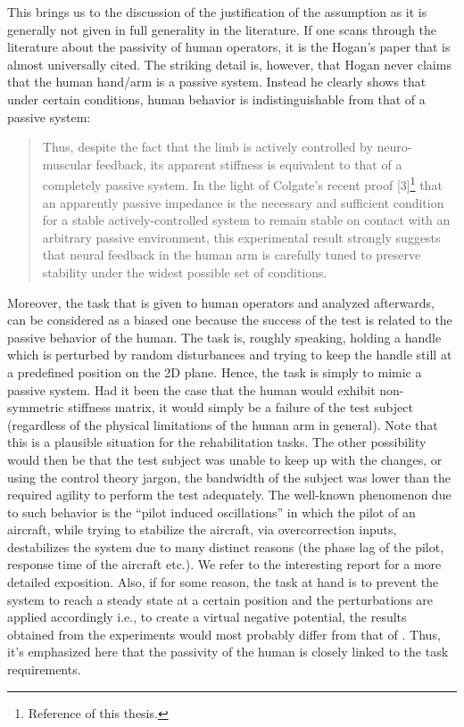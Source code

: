 This brings us to the discussion of the justification of the assumption as it is generally not given in full generality in the
literature. If one scans through the literature about the passivity of human operators, it is the Hogan's paper \cite{hogan89}
that is almost universally cited. The striking detail is, however, that Hogan never claims that the human hand/arm is a passive
system. Instead he clearly shows that under certain conditions, human behavior is indistinguishable from that of a 
passive system: 
\begin{quote}
Thus, despite the fact that the
limb is actively controlled by neuro-muscular feedback, its apparent
stiffness is equivalent to that of a completely passive
system. In the light of Colgate's recent proof [3]\footnote{Reference 
\cite{colgatehogan88} of this thesis.} that an
apparently passive impedance is the necessary and sufficient
condition for a stable actively-controlled system to remain stable
on contact with an arbitrary passive environment, this
experimental result strongly suggests that neural feedback in the
human arm is carefully tuned to preserve stability under the
widest possible set of conditions.
\end{quote}
Moreover, the task that is given to human operators and analyzed afterwards, can be considered as a biased one because the success 
of the test is related to the passive behavior of the human. The task is, roughly speaking, holding a handle which is perturbed by 
random disturbances and trying to keep the handle still at a predefined position on the 2D plane. Hence, the task is simply to mimic 
a passive system. Had it been the case that the human would exhibit non-symmetric stiffness matrix, it would simply be a failure of 
the test subject (regardless of the physical limitations of the human arm in general). Note that this is a plausible situation for 
the rehabilitation tasks. The other possibility would then be that the test subject was unable to keep up with the changes, or using 
the control theory jargon, the bandwidth of the subject was lower than the required agility to perform the test adequately. The 
well-known phenomenon due to such behavior is the \enquote{pilot induced oscillations} in which the pilot of an aircraft, while trying 
to stabilize the aircraft, via overcorrection inputs, destabilizes the system due to many distinct reasons (the phase lag of the 
pilot, response time of the aircraft etc.). We refer to the interesting report \cite{mcruer} for a more detailed exposition. Also, 
if for some reason, the task at hand is to prevent the system to reach a steady state at a certain position and the perturbations are 
applied accordingly i.e., to create a virtual negative potential, the results obtained from the experiments would most probably differ 
from that of \cite{mussa85}. Thus, it's emphasized here that the passivity of the human is closely linked to the task requirements. 



